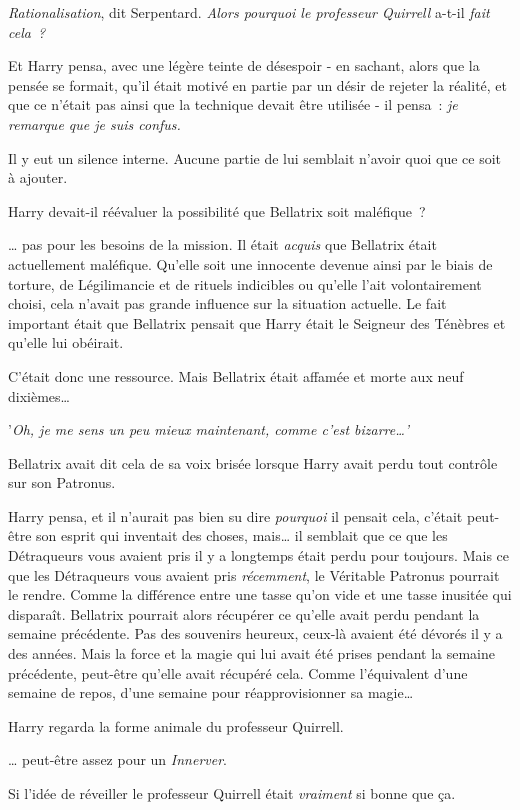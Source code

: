 \emph{Rationalisation}, dit Serpentard. \emph{Alors pourquoi le professeur Quirrell} a-t-il \emph{fait cela~?}

Et Harry pensa, avec une légère teinte de désespoir - en sachant, alors que la pensée se formait, qu'il était motivé en partie par un désir de rejeter la réalité, et que ce n'était pas ainsi que la technique devait être utilisée - il pensa~: \emph{je remarque que je suis confus.}

Il y eut un silence interne. Aucune partie de lui semblait n'avoir quoi que ce soit à ajouter.

Harry devait-il réévaluer la possibilité que Bellatrix soit maléfique~?

… pas pour les besoins de la mission. Il était \emph{acquis} que Bellatrix était actuellement maléfique. Qu'elle soit une innocente devenue ainsi par le biais de torture, de Légilimancie et de rituels indicibles ou qu'elle l'ait volontairement choisi, cela n'avait pas grande influence sur la situation actuelle. Le fait important était que Bellatrix pensait que Harry était le Seigneur des Ténèbres et qu'elle lui obéirait.

C'était donc une ressource. Mais Bellatrix était affamée et morte aux neuf dixièmes…

'\emph{Oh, je me sens un peu mieux maintenant, comme c'est bizarre…'}

Bellatrix avait dit cela de sa voix brisée lorsque Harry avait perdu tout contrôle sur son Patronus.

Harry pensa, et il n'aurait pas bien su dire \emph{pourquoi} il pensait cela, c'était peut-être son esprit qui inventait des choses, mais… il semblait que ce que les Détraqueurs vous avaient pris il y a longtemps était perdu pour toujours. Mais ce que les Détraqueurs vous avaient pris \emph{récemment}, le Véritable Patronus pourrait le rendre. Comme la différence entre une tasse qu'on vide et une tasse inusitée qui disparaît. Bellatrix pourrait alors récupérer ce qu'elle avait perdu pendant la semaine précédente. Pas des souvenirs heureux, ceux-là avaient été dévorés il y a des années. Mais la force et la magie qui lui avait été prises pendant la semaine précédente, peut-être qu'elle avait récupéré cela. Comme l'équivalent d'une semaine de repos, d'une semaine pour réapprovisionner sa magie…

Harry regarda la forme animale du professeur Quirrell.

… peut-être assez pour un \emph{Innerver}.

Si l'idée de réveiller le professeur Quirrell était \emph{vraiment} si bonne que ça.

